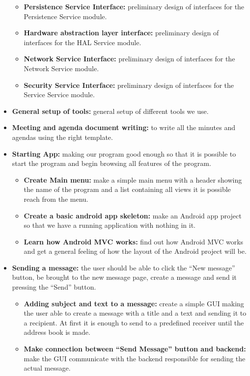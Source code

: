 \begin{itemize}
\begin{itemize}
\item{}\textbf{Persistence Service Interface:} preliminary design of interfaces for the Persistence Service module.
\item{}\textbf{Hardware abstraction layer interface:} preliminary design of interfaces for the HAL Service module.
\item{}\textbf{Network Service Interface:} preliminary design of interfaces for the Network Service module.
\item{}\textbf{Security Service Interface:} preliminary design of interfaces for the Service Service module.
\end{itemize}
\item{}\textbf{General setup of tools:} general setup of different tools we use.
\item{}\textbf{Meeting and agenda document writing:} to write all the minutes and agendas using the right template.
\item{}\textbf{Starting App:} making our program good enough so that it is possible to start the program and begin browsing all features of the program.
\begin{itemize}
\item{}\textbf{Create Main menu:} make a simple main menu with a header showing the name of the program and a list containing all views it is possible reach from the menu.
\item{}\textbf{Create a basic android app skeleton:} make an Android app project so that we have a running application with nothing in it.
\item{}\textbf{Learn how Android MVC works:} find out how Android MVC works and get a general feeling of how the layout of the Android project will be.
\end{itemize}
\item{}\textbf{Sending a message:} the user should be able to click the “New message” button, be brought to the new message page, create a message and send it pressing the “Send” button.
\begin{itemize}
\item{}\textbf{Adding subject and text to a message:} create a simple GUI making the user able to create a message with a title and a text and sending it to a recipient. At first it is enough to send to a predefined receiver until the address book is made.
\item{}\textbf{Make connection between “Send Message” button and backend:} make the GUI communicate with the backend responsible for sending the actual message.

\end{itemize}
\end{itemize}
